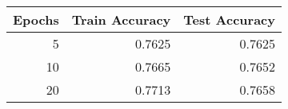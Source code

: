 \begin{tabular}{|r||r|r|}
\hline
Epochs & Train Accuracy & Test Accuracy \\
\hline
5 & 0.7625 & 0.7625 \\
10 & 0.7665 & 0.7652 \\
20 & 0.7713 & 0.7658 \\
\hline
\end{tabular}
